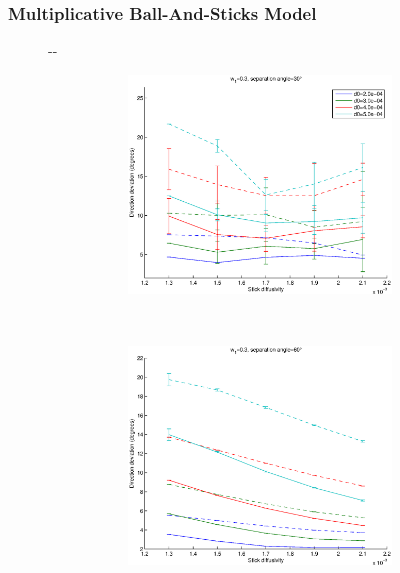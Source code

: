 \documentclass{article}
\begin{document}
\subsubsection{Multiplicative Ball-And-Sticks Model}
\begin{figure}[H]
  \begin{adjustwidth}{-\oddsidemargin}{-\rightmargin}
    \begin{subfigure}{0.8\paperwidth}
      \begin{subfigure}{0.3\textwidth}
        \centering
        \includegraphics[width=\textwidth]{figures/synth_modbas_weights__snr=20__w1=3__angle=30.eps}
      \end{subfigure}
      ~
      \begin{subfigure}{0.3\textwidth}
        \centering
        \includegraphics[width=\textwidth]{figures/synth_modbas_weights__snr=20__w1=3__angle=60.eps}

\end{subfigure}
\end{subfigure}
\end{adjustwidth}
\end{figure}
\end{document}
